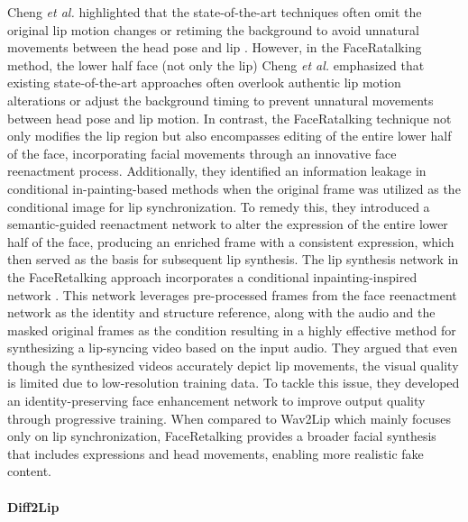 Cheng \textit{et al.} \cite{cheng2022videoretalking} highlighted that the state-of-the-art techniques often omit the original lip motion changes or retiming the background to avoid unnatural movements between the head pose and lip \cite{prajwal2020lip, song2022everybody}. However, in the FaceRatalking method, the lower half face (not only the lip) Cheng \textit{et al.} emphasized that existing state-of-the-art approaches often overlook authentic lip motion alterations or adjust the background timing to prevent unnatural movements between head pose and lip motion. In contrast, the FaceRatalking technique not only modifies the lip region but also encompasses editing of the entire lower half of the face, incorporating facial movements through an innovative face reenactment process. Additionally, they identified an information leakage in conditional in-painting-based methods when the original frame was utilized as the conditional image for lip synchronization. To remedy this, they introduced a semantic-guided reenactment network to alter the expression of the entire lower half of the face, producing an enriched frame with a consistent expression, which then served as the basis for subsequent lip synthesis. The lip synthesis network in the FaceRetalking approach incorporates a conditional inpainting-inspired network \cite{prajwal2020lip}. This network leverages pre-processed frames from the face reenactment network as the identity and structure reference, along with the audio and the masked original frames as the condition resulting in a highly effective method for synthesizing a lip-syncing video based on the input audio. They argued that even though the synthesized videos accurately depict lip movements, the visual quality is limited due to low-resolution training data. To tackle this issue, they developed an identity-preserving face enhancement network to improve output quality through progressive training. When compared to Wav2Lip \cite{prajwal2020lip} which mainly focuses only on lip synchronization, FaceRetalking provides a broader facial synthesis that includes expressions and head movements, enabling more realistic fake content.

\paragraph{Diff2Lip}
\label{para:multimodal_diff2lip}

